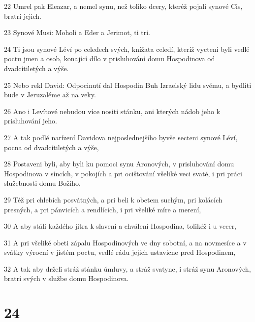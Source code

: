 \par 22 Umrel pak Eleazar, a nemel synu, než toliko dcery, kteréž pojali synové Cis, bratrí jejich.
\par 23 Synové Musi: Moholi a Eder a Jerimot, ti tri.
\par 24 Ti jsou synové Léví po celedech svých, knížata celedí, kteríž vycteni byli vedlé poctu jmen a osob, konající dílo v prisluhování domu Hospodinova od dvadcítiletých a výše.
\par 25 Nebo rekl David: Odpocinutí dal Hospodin Buh Izraelský lidu svému, a bydliti bude v Jeruzaléme až na veky.
\par 26 Ano i Levítové nebudou více nositi stánku, ani kterých nádob jeho k prisluhování jeho.
\par 27 A tak podlé narízení Davidova nejposlednejšího byvše secteni synové Léví, pocna od dvadcítiletých a výše,
\par 28 Postaveni byli, aby byli ku pomoci synu Aronových, v prisluhování domu Hospodinova v síncích, v pokojích a pri ocištování všeliké veci svaté, i pri práci služebnosti domu Božího,
\par 29 Též pri chlebích posvátných, a pri beli k obetem suchým, pri kolácích presných, a pri pánvicích a rendlících, i pri všeliké míre a merení,
\par 30 A aby stáli každého jitra k slavení a chválení Hospodina, tolikéž i u vecer,
\par 31 A pri všeliké obeti zápalu Hospodinových ve dny sobotní, a na novmesíce a v svátky výrocní v jistém poctu, vedlé rádu jejich ustavicne pred Hospodinem,
\par 32 A tak aby drželi stráž stánku úmluvy, a stráž svatyne, i stráž synu Aronových, bratrí svých v službe domu Hospodinova.

\chapter{24}


